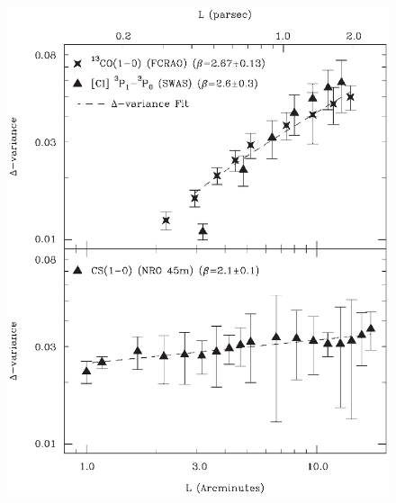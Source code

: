 \documentclass[12pt]{article}
\begin{document}
            \begin{figure}[hb]
              \centering
              \includegraphics[totalheight=80 mm]{img/Plume2000.eps}
            \end{figure}
        \clearpage
        \begin{small}
        \cite{2001ApJ...548..749E}
        \end{small}
\end{document}
